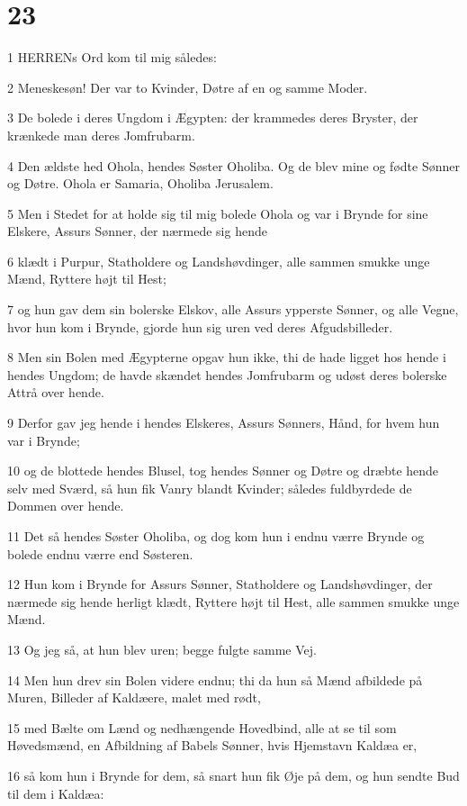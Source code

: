\chapter{23}

\par 1 HERRENs Ord kom til mig således:
\par 2 Meneskesøn! Der var to Kvinder, Døtre af en og samme Moder.
\par 3 De bolede i deres Ungdom i Ægypten: der krammedes deres Bryster, der krænkede man deres Jomfrubarm.
\par 4 Den ældste hed Ohola, hendes Søster Oholiba. Og de blev mine og fødte Sønner og Døtre. Ohola er Samaria, Oholiba Jerusalem.
\par 5 Men i Stedet for at holde sig til mig bolede Ohola og var i Brynde for sine Elskere, Assurs Sønner, der nærmede sig hende
\par 6 klædt i Purpur, Statholdere og Landshøvdinger, alle sammen smukke unge Mænd, Ryttere højt til Hest;
\par 7 og hun gav dem sin bolerske Elskov, alle Assurs ypperste Sønner, og alle Vegne, hvor hun kom i Brynde, gjorde hun sig uren ved deres Afgudsbilleder.
\par 8 Men sin Bolen med Ægypterne opgav hun ikke, thi de hade ligget hos hende i hendes Ungdom; de havde skændet hendes Jomfrubarm og udøst deres bolerske Attrå over hende.
\par 9 Derfor gav jeg hende i hendes Elskeres, Assurs Sønners, Hånd, for hvem hun var i Brynde;
\par 10 og de blottede hendes Blusel, tog hendes Sønner og Døtre og dræbte hende selv med Sværd, så hun fik Vanry blandt Kvinder; således fuldbyrdede de Dommen over hende.
\par 11 Det så hendes Søster Oholiba, og dog kom hun i endnu værre Brynde og bolede endnu værre end Søsteren.
\par 12 Hun kom i Brynde for Assurs Sønner, Statholdere og Landshøvdinger, der nærmede sig hende herligt klædt, Ryttere højt til Hest, alle sammen smukke unge Mænd.
\par 13 Og jeg så, at hun blev uren; begge fulgte samme Vej.
\par 14 Men hun drev sin Bolen videre endnu; thi da hun så Mænd afbildede på Muren, Billeder af Kaldæere, malet med rødt,
\par 15 med Bælte om Lænd og nedhængende Hovedbind, alle at se til som Høvedsmænd, en Afbildning af Babels Sønner, hvis Hjemstavn Kaldæa er,
\par 16 så kom hun i Brynde for dem, så snart hun fik Øje på dem, og hun sendte Bud til dem i Kaldæa:

